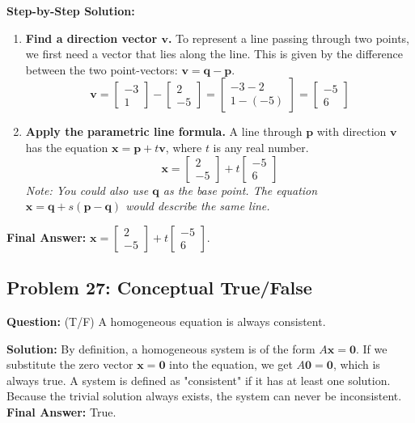 \documentclass[11pt]{article}
\begin{document}
\textbf{Step-by-Step Solution:}
\begin{enumerate}
    \item \textbf{Find a direction vector $\mathbf{v}$.} To represent a line passing through two points, we first need a vector that lies along the line. This is given by the difference between the two point-vectors: $\mathbf{v} = \mathbf{q} - \mathbf{p}$.
    \[
    \mathbf{v} = \begin{bmatrix} -3 \\ 1 \end{bmatrix} - \begin{bmatrix} 2 \\ -5 \end{bmatrix} = \begin{bmatrix} -3 - 2 \\ 1 - (-5) \end{bmatrix} = \begin{bmatrix} -5 \\ 6 \end{bmatrix}
    \]
    \item \textbf{Apply the parametric line formula.} A line through $\mathbf{p}$ with direction $\mathbf{v}$ has the equation $\mathbf{x} = \mathbf{p} + t\mathbf{v}$, where $t$ is any real number.
    \[
    \mathbf{x} = \begin{bmatrix} 2 \\ -5 \end{bmatrix} + t \begin{bmatrix} -5 \\ 6 \end{bmatrix}
    \]
    \textit{Note: You could also use $\mathbf{q}$ as the base point. The equation $\mathbf{x} = \mathbf{q} + s(\mathbf{p} - \mathbf{q})$ would describe the same line.}
\end{enumerate}
\textbf{Final Answer:} $\mathbf{x} = \begin{bmatrix} 2 \\ -5 \end{bmatrix} + t \begin{bmatrix} -5 \\ 6 \end{bmatrix}$.

\subsection*{Problem 27: Conceptual True/False}
\textbf{Question:} (T/F) A homogeneous equation is always consistent.

\textbf{Solution:}
By definition, a homogeneous system is of the form $A\mathbf{x} = \mathbf{0}$. If we substitute the zero vector $\mathbf{x} = \mathbf{0}$ into the equation, we get $A\mathbf{0} = \mathbf{0}$, which is always true. A system is defined as "consistent" if it has at least one solution. Because the trivial solution always exists, the system can never be inconsistent.
\textbf{Final Answer:} True.
\end{document}
